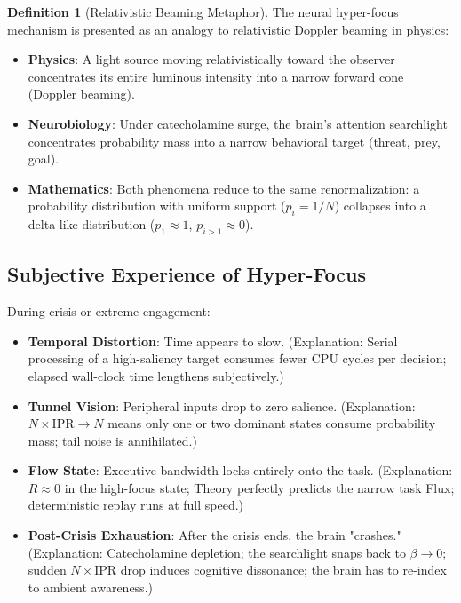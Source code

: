 \documentclass[11pt,oneside]{article}
\theoremstyle{definition}
\newtheorem{definition}[theorem]{Definition}
\begin{document}
\begin{definition}[Relativistic Beaming Metaphor]
The neural hyper-focus mechanism is presented as an analogy to relativistic Doppler beaming in physics:

\begin{itemize}
  \item \textbf{Physics}: A light source moving relativistically toward the observer concentrates its entire luminous intensity into a narrow forward cone (Doppler beaming).

  \item \textbf{Neurobiology}: Under catecholamine surge, the brain's attention searchlight concentrates probability mass into a narrow behavioral target (threat, prey, goal).

  \item \textbf{Mathematics}: Both phenomena reduce to the same renormalization: a probability distribution with uniform support ($p_i = 1/N$) collapses into a delta-like distribution ($p_1 \approx 1$, $p_{i>1} \approx 0$).
\end{itemize}

\end{definition}

\subsection{Subjective Experience of Hyper-Focus}

During crisis or extreme engagement:

\begin{itemize}
  \item \textbf{Temporal Distortion}: Time appears to slow. (Explanation: Serial processing of a high-saliency target consumes fewer CPU cycles per decision; elapsed wall-clock time lengthens subjectively.)

  \item \textbf{Tunnel Vision}: Peripheral inputs drop to zero salience. (Explanation: $N \times \text{IPR} \to N$ means only one or two dominant states consume probability mass; tail noise is annihilated.)

  \item \textbf{Flow State}: Executive bandwidth locks entirely onto the task. (Explanation: $R \approx 0$ in the high-focus state; Theory perfectly predicts the narrow task Flux; deterministic replay runs at full speed.)

  \item \textbf{Post-Crisis Exhaustion}: After the crisis ends, the brain "crashes." (Explanation: Catecholamine depletion; the searchlight snaps back to $\beta \to 0$; sudden $N \times \text{IPR}$ drop induces cognitive dissonance; the brain has to re-index to ambient awareness.)
\end{itemize}
\end{document}
